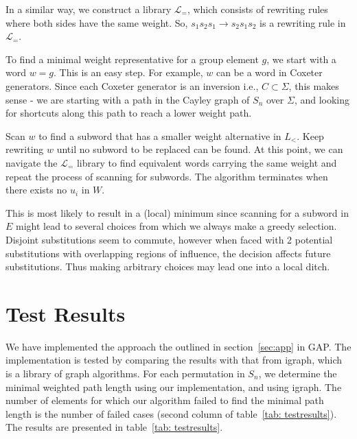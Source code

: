 \documentclass{article}
\begin{document}
In a similar way, we construct a library $\mathcal{L}_{=}$, which consists of rewriting rules where both sides have the same weight. So, $s_1 s_2 s_1 \rightarrow s_2 s_1 s_2$ is a rewriting rule in $\mathcal{L}_{=}$.

To find a minimal weight representative for a group element $g$, we start with a word $w = g$. This is an easy step. For example, $w$ can be a word in Coxeter generators. Since each Coxeter generator is an inversion i.e., $C \subset \Sigma$, this makes sense - we are starting with a path in the Cayley graph of $S_n$ over $\Sigma$, and looking for shortcuts along this path to reach a lower weight path.

Scan $w$ to find a subword that has a smaller weight alternative in $L_{<}$. Keep rewriting $w$ until no subword to be replaced can be found.
At this point, we can navigate the $\mathcal{L}_{=}$ library to find equivalent words carrying the same weight and repeat the process of scanning for subwords.
The algorithm terminates when there exists no $u_i$ in $W$. 

This is most likely to result in a (local) minimum since scanning for a subword in $E$ might lead to several choices from which we always make a greedy selection. Disjoint substitutions seem to commute, however when faced with 2 potential substitutions with overlapping regions of influence, the decision affects future substitutions. Thus making arbitrary choices may lead one into a local ditch. 


\section{Test Results}
We have implemented the approach the outlined in section~\ref{sec:app} in GAP. The implementation is tested by comparing the results with that from igraph, which is a library of graph algorithms. For each permutation in $S_n$, we determine the minimal weighted path length using our implementation, and using igraph. The number of elements for which our algorithm failed to find the minimal path length is the number of failed cases (second column of table~\ref{tab: testresults}). The results are presented in table~\ref{tab: testresults}. 
\end{document}
